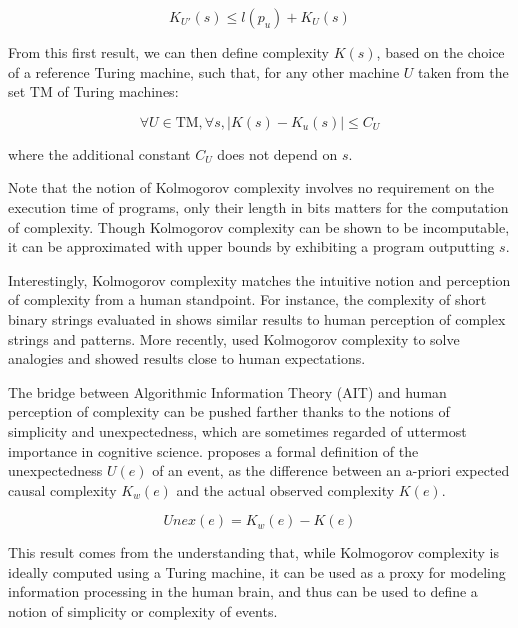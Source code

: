 \documentclass[entropy,article,submit,moreauthors,pdftex]{Definitions/mdpi}
\begin{document}
\begin{equation}
    \label{eq:inequality_univ}
    K_{U'}(s) \le l(p_{u}) + K_{U}(s)
\end{equation}

From this first result, we can then define complexity $K(s)$, based on the choice of a reference Turing machine, such that, for any other
machine $U$ taken from the set $\text{TM}$ of Turing machines:

\begin{equation}
    \forall U\in\text{TM}, \forall s, |K(s) - K_{u}(s)| \le C_{U}
\end{equation}

where the additional constant $C_{U}$ does not depend on $s$.

Note that the notion of Kolmogorov complexity involves no requirement on the execution time of
programs, only their length in bits matters for the computation of
complexity. Though Kolmogorov complexity can be shown to be
incomputable\cite{li_introduction_2008},
it can be approximated with
upper bounds by exhibiting a program outputting $s$.

Interestingly, Kolmogorov complexity matches the intuitive
notion and perception of complexity from a human standpoint. For instance, the
complexity of short binary strings evaluated in \cite{delahaye_numerical_2012}
shows similar results to human perception of complex strings and patterns. More
recently, \cite{murena_solving_2020} used Kolmogorov complexity to solve
analogies and showed results close to human expectations.

The bridge between Algorithmic Information Theory (AIT) and human perception of
complexity can be pushed farther thanks to the notions of simplicity and unexpectedness,
which are sometimes regarded of uttermost importance in cognitive science\cite
{chater_simplicity_2003}.
\cite{dessalles2011coincidences} proposes a formal definition of the
unexpectedness $U(e)$ of an event, as the difference between an a-priori
expected causal complexity $K_{w}(e)$ and the actual observed complexity $K
    (e)$.

\begin{equation}
    \label{eq:unexpected} \textit{Unex}(e) = K_{w}(e) - K(e)
\end{equation}

This result comes from the understanding that, while Kolmogorov complexity is
ideally computed using a Turing machine, it can be used as a proxy for modeling
information processing in the human brain, and thus can be used to define a notion of
simplicity or complexity of events.
\end{document}
